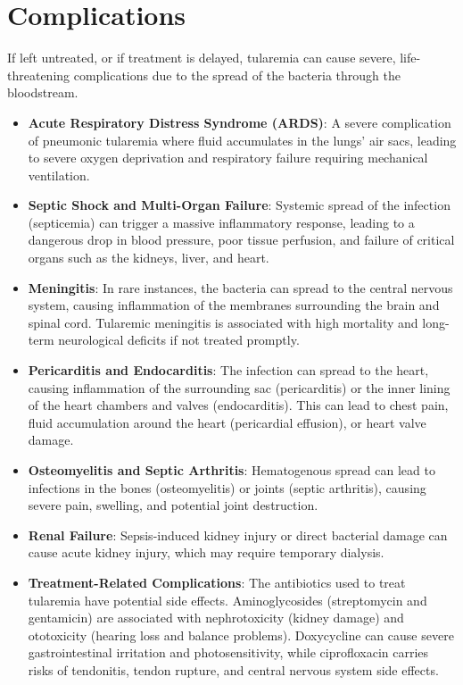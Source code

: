 \section*{Complications}
If left untreated, or if treatment is delayed, tularemia can cause severe, life-threatening complications due to the spread of the bacteria through the bloodstream.
\begin{itemize}
    \item \textbf{Acute Respiratory Distress Syndrome (ARDS)}: A severe complication of pneumonic tularemia where fluid accumulates in the lungs' air sacs, leading to severe oxygen deprivation and respiratory failure requiring mechanical ventilation.
    \item \textbf{Septic Shock and Multi-Organ Failure}: Systemic spread of the infection (septicemia) can trigger a massive inflammatory response, leading to a dangerous drop in blood pressure, poor tissue perfusion, and failure of critical organs such as the kidneys, liver, and heart.
    \item \textbf{Meningitis}: In rare instances, the bacteria can spread to the central nervous system, causing inflammation of the membranes surrounding the brain and spinal cord. Tularemic meningitis is associated with high mortality and long-term neurological deficits if not treated promptly.
    \item \textbf{Pericarditis and Endocarditis}: The infection can spread to the heart, causing inflammation of the surrounding sac (pericarditis) or the inner lining of the heart chambers and valves (endocarditis). This can lead to chest pain, fluid accumulation around the heart (pericardial effusion), or heart valve damage.
    \item \textbf{Osteomyelitis and Septic Arthritis}: Hematogenous spread can lead to infections in the bones (osteomyelitis) or joints (septic arthritis), causing severe pain, swelling, and potential joint destruction.
    \item \textbf{Renal Failure}: Sepsis-induced kidney injury or direct bacterial damage can cause acute kidney injury, which may require temporary dialysis.
    \item \textbf{Treatment-Related Complications}: The antibiotics used to treat tularemia have potential side effects. Aminoglycosides (streptomycin and gentamicin) are associated with nephrotoxicity (kidney damage) and ototoxicity (hearing loss and balance problems). Doxycycline can cause severe gastrointestinal irritation and photosensitivity, while ciprofloxacin carries risks of tendonitis, tendon rupture, and central nervous system side effects.
\end{itemize}

